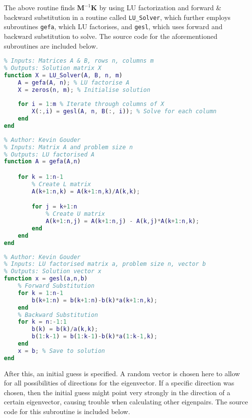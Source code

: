 \documentclass[11pt,oneside]{article}
\begin{document}
The above routine finds $\mathbf{M}^{-1}\mathbf{K}$ by using LU factorization and forward \& backward substitution in a routine called \texttt{LU\_Solver}, which further employs subroutines \texttt{gefa}, which LU factorises, and \texttt{gesl}, which uses forward and backward substitution to solve. The source code for the aforementioned subroutines are included below.

\begin{lstlisting}[language=Matlab]
%% Solve matrix system AX=B using LU factorization
% Inputs: Matrices A & B, rows n, columns m
% Outputs: Solution matrix X
function X = LU_Solver(A, B, n, m)
    A = gefa(A, n); % LU factorise A
    X = zeros(n, m); % Initialise solution
    
    for i = 1:m % Iterate through columns of X
        X(:,i) = gesl(A, n, B(:, i)); % Solve for each column
    end
end
\end{lstlisting}

\begin{lstlisting}[language=Matlab]
%% LU factorise matrix A
% Author: Kevin Gouder
% Inputs: Matrix A and problem size n
% Outputs: LU factorised A
function A = gefa(A,n)

    for k = 1:n-1
        % Create L matrix
        A(k+1:n,k) = A(k+1:n,k)/A(k,k);

        for j = k+1:n
            % Create U matrix
            A(k+1:n,j) = A(k+1:n,j) - A(k,j)*A(k+1:n,k);
        end
    end
end
\end{lstlisting}

\begin{lstlisting}[language=Matlab]
%% Use LU factorised matrix to solve
% Author: Kevin Gouder
% Inputs: LU factorised matrix a, problem size n, vector b
% Outputs: Solution vector x
function x = gesl(a,n,b)
    % Forward Substitution
    for k = 1:n-1
        b(k+1:n) = b(k+1:n)-b(k)*a(k+1:n,k);
    end
    % Backward Substitution
    for k = n:-1:1
        b(k) = b(k)/a(k,k);
        b(1:k-1) = b(1:k-1)-b(k)*a(1:k-1,k);
    end
    x = b; % Save to solution
end
\end{lstlisting}

After this, an initial guess is specified. A random vector is chosen here to allow for all possibilities of directions for the eigenvector. If a specific direction was chosen, then the initial guess might point very strongly in the direction of a certain eigenvector, causing trouble when calculating other eigenpairs. The source code for this subroutine is included below.
\end{document}

